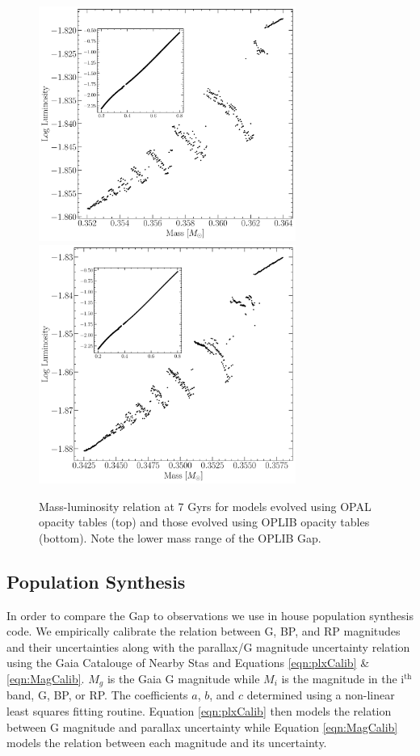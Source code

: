 \begin{figure}
	\centering
	\includegraphics[width=0.75\textwidth]{figures/jaoOpacity/OPALPunchIn.pdf}
	\includegraphics[width=0.75\textwidth]{figures/jaoOpacity/OPLIBPunchIn.pdf}
	\caption{Mass-luminosity relation at 7 Gyrs for models evolved using OPAL opacity
	tables (top) and those evolved using OPLIB opacity tables (bottom). Note
	the lower mass range of the OPLIB Gap.}
	\label{fig:PunchIn}
		
\end{figure}

\subsection{Population Synthesis}
In order to compare the Gap to observations we use in house population
synthesis code. We empirically calibrate the relation between G, BP, and RP
magnitudes and their uncertainties along with the parallax/G magnitude
uncertainty relation using the Gaia Catalouge of Nearby Stas
\citep[GCNS,][]{GaiaCollaboration2021} and Equations \ref{eqn:plxCalib} \&
\ref{eqn:MagCalib}. $M_{g}$ is the Gaia G magnitude while $M_{i}$ is the
magnitude in the i$^\text{th}$ band, G, BP, or RP. The coefficients $a$, $b$,
and $c$ determined using a non-linear least squares fitting routine. Equation
\ref{eqn:plxCalib} then models the relation between G magnitude and parallax
uncertainty while Equation \ref{eqn:MagCalib} models the relation between each
magnitude and its uncertainty.

